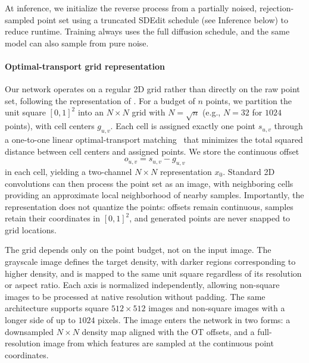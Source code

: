 \documentclass{egpubl}
\providecommand{\citet}[1]{\cite{#1}}
\begin{document}
At inference, we initialize the reverse process from a partially noised, rejection-sampled point set using a truncated SDEdit schedule (see Inference below) to reduce runtime. Training always uses the full diffusion schedule, and the same model can also sample from pure noise.



\paragraph{Optimal-transport grid representation}
%
Our network operates on a regular 2D grid rather than directly on the raw point set, following the representation of \citet{10.1145/3610548.3618243}. For a budget of $n$ points, we partition the unit square $[0,1]^2$ into an $N\times N$ grid with $N=\sqrt{n}$ (e.g., $N=32$ for $1024$ points), with cell centers $g_{u,v}$. Each cell is assigned exactly one point $s_{u,v}$ through a one-to-one linear optimal-transport matching~\cite{10.1145/2070781.2024192} that minimizes the total squared distance between cell centers and assigned points. We store the continuous offset
$$
o_{u,v}=s_{u,v}-g_{u,v}
$$
in each cell, yielding a two-channel $N\times N$ representation $x_0$. Standard 2D convolutions can then process the point set as an image, with neighboring cells providing an approximate local neighborhood of nearby samples. Importantly, the representation does not quantize the points: offsets remain continuous, samples retain their coordinates in $[0,1]^2$, and generated points are never snapped to grid locations.


The grid depends only on the point budget, not on the input image. The grayscale image defines the target density, with darker regions corresponding to higher density, and is mapped to the same unit square regardless of its resolution or aspect ratio. Each axis is normalized independently, allowing non-square images to be processed at native resolution without padding. The same architecture supports square $512\times512$ images and non-square images with a longer side of up to $1024$ pixels. The image enters the network in two forms: a downsampled $N\times N$ density map aligned with the OT offsets, and a full-resolution image from which features are sampled at the continuous point coordinates.

\end{document}
